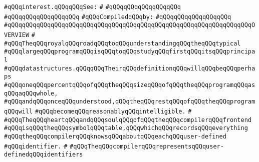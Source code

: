\verb|#qQQqinterest.qQQqqQQqSee:|\newline
\verb|#|\newline
\verb|#qQQqqQQqqQQqqQQqqQQq|\newline
\verb|#qQQqqQQqqQQqqQQqqQQq|\newline
\newline
\verb|#qQQqCompiledqQQqby:|\newline
\verb|#qQQqqQQqqQQqqQQqqQQq|\newline
\newline
\newline
\newline
\verb|#qQQqqQQqqQQqqQQqqQQqqQQqqQQqqQQqqQQqqQQqqQQqqQQqqQQqqQQqqQQqqQQqqQQqOVERVIEW|\newline
\verb|#|\newline
\verb|#qQQqTheqQQqroyalqQQqroadqQQqtoqQQqunderstandingqQQqtheqQQqtypical|\newline
\verb|#qQQqlargeqQQqprogramqQQqisqQQqtoqQQqstudyqQQqfirstqQQqitsqQQqprincipal|\newline
\verb|#qQQqdatastructures.qQQqqQQqTheirqQQqdefinitionqQQqwillqQQqbeqQQqperhaps|\newline
\verb|#qQQqoneqQQqpercentqQQqofqQQqtheqQQqsizeqQQqofqQQqtheqQQqprogramqQQqasqQQqaqQQqwhole,|\newline
\verb|#qQQqandqQQqonceqQQqunderstood,qQQqtheqQQqrestqQQqofqQQqtheqQQqprogramqQQqwill|\newline
\verb|#qQQqbecomeqQQqreasonablyqQQqintelligible.|\newline
\verb|#|\newline
\verb|#qQQqTheqQQqheartqQQqandqQQqsoulqQQqofqQQqtheqQQqcompilerqQQqfrontend|\newline
\verb|#qQQqisqQQqtheqQQqsymbolqQQqtable,qQQqwhichqQQqrecordsqQQqeverything|\newline
\verb|#qQQqtheqQQqcompilerqQQqknowsqQQqaboutqQQqeachqQQquser-defined|\newline
\verb|#qQQqidentifier.|\newline
\verb|#|\newline
\verb|#qQQqTheqQQqcompilerqQQqrepresentsqQQquser-definedqQQqidentifiers|\newline
